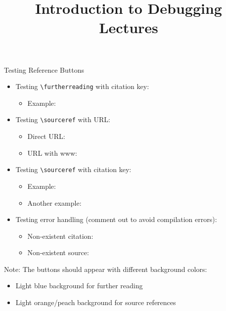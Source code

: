 \documentclass[11pt,compress,t,notes=noshow, xcolor=table]{beamer}
\title{Introduction to Debugging Lectures}
\begin{document}

\begin{frame}{Testing Reference Buttons}

\begin{itemize}
\item Testing \texttt{\textbackslash furtherreading} with citation key:
  \begin{itemize}
  \item Example: 
  \end{itemize}

\item Testing \texttt{\textbackslash sourceref} with URL:
  \begin{itemize}
  \item Direct URL: 
  \item URL with www: 
  \end{itemize}

\item Testing \texttt{\textbackslash sourceref} with citation key:
  \begin{itemize}
  \item Example: 
  \item Another example: 
  \end{itemize}
  
\item Testing error handling (comment out to avoid compilation errors):
  \begin{itemize}
  \item Non-existent citation: %
  \item Non-existent source: %
  \end{itemize}

\end{itemize}

\vspace{1em}
Note: The buttons should appear with different background colors:
\begin{itemize}
\item Light blue background for further reading
\item Light orange/peach background for source references
\end{itemize}

\end{frame}

\endlecture
\end{document}
